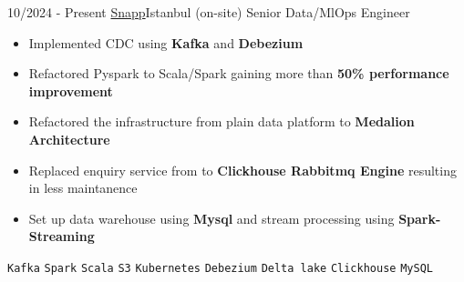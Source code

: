 \documentclass[9pt]{developercv} %
\begin{document}
\vspace{-5pt}
\begin{entrylist}
    \entry
    {10/2024 - Present}
    {\href{https://snapp.ir}{Snapp}\newline\small\textnormal{Istanbul (on-site)}}
    {Senior Data/MlOps Engineer}
    {\vspace{-6pt}
    \begin{itemize}[itemsep=2pt,topsep=0pt,parsep=0pt,partopsep=0pt, leftmargin=-1pt]
        \item{Implemented CDC using \textbf{Kafka} and \textbf{Debezium}}
        \item{Refactored Pyspark to Scala/Spark gaining more than \textbf{50\% performance improvement}}
        \item{Refactored the infrastructure from plain data platform to \textbf{Medalion Architecture}}
        \item{Replaced enquiry service from to \textbf{Clickhouse Rabbitmq Engine} resulting in less maintanence}
        \item{Set up data warehouse using \textbf{Mysql} and stream processing using \textbf{Spark-Streaming}}
    \end{itemize}
    {\vspace{2pt}}
    \texttt{Kafka} \slashsep \texttt{Spark} \slashsep \texttt{Scala} \slashsep \texttt{S3} \slashsep \texttt{Kubernetes} \slashsep \texttt{Debezium} \slashsep \texttt{Delta lake} \slashsep \texttt{Clickhouse} \slashsep \texttt{MySQL}}
\end{entrylist}
\end{document}
